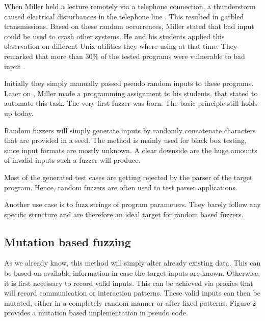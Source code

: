 \documentclass[journal=tosc,final]{iacrtrans}
\begin{document}
When Miller held a lecture remotely via a telephone connection, a thunderstorm caused electrical disturbances in the telephone line . This resulted in garbled transmissions. Based on these random occurrences, Miller stated that bad input  could be used to crash other systems. He and his students applied this observation on different Unix utilities they where using at that time. They remarked that  more than 30\% of the tested programs were vulnerable to bad input \cite{fuzz}. 

Initially they simply manually passed pseudo random inputs to these programs. Later on , Miller made a programming assignment to his students, that stated to automate this task. The very first fuzzer was born. The basic principle still holds up today. 

Random fuzzers will simply generate inputs by randomly concatenate characters that are provided in a seed. The method is mainly used for black box testing, since input formats are mostly unknown. A clear downside are the huge amounts of invalid inputs such a fuzzer will produce. 

Most of the generated test cases are getting rejected by the parser of the target program. Hence, random fuzzers are often used to test parser applications.

Another use case is to fuzz strings of program parameters. They barely follow any specific structure and are therefore an ideal target for random based fuzzers. 
\subsection{Mutation based fuzzing}
As we already know, this method will simply alter already existing data. This can be based on available information in case the target inputs are known. Otherwise, it is first necessary to record valid inputs. This can be achieved via proxies that will record communication or interaction patterns. These valid inputs can then be mutated, either in a completely random manner or after fixed patterns. Figure 2 provides a mutation based implementation in pseudo code. 
\end{document}
